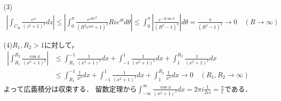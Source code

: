 \documentclass[
		book,
		head_space=20mm,
		foot_space=20mm,
		gutter=10mm,
		line_length=190mm
]{jlreq}
\begin{document}
 (3)\begin{align}
	\left|\int_{C_R} \frac{e^{iz}}{(z^2+1)^2}dz\right|\le \left| \int_0^\pi \frac{e^{iRe^{i\theta}}}{(R^2e^{2i\theta}+1)^2}Rie^{i\theta}d\theta\right| \le \int_0^\pi \left|\frac{e^{-R\sin \theta}}{(R^2-1)^2}\right|d\theta = \frac{\pi}{(R^2-1)^2}\rightarrow 0 \quad (R\rightarrow \infty)
 \end{align}

 (4)$R_1,R_2>1$に対して，
 \begin{align}
	\left|\int_{R_1}^{R_2} \frac{\cos x}{(x^2+1)^2}\right| &\le \int_{R_1}^{-1} \frac{1}{(x^2+1)^2}dx + \int_{-1}^{1} \frac{1}{(x^2+1)^2}dx + \int_{1}^{R_2} \frac{1}{(x^2+1)^2}dx \\
	&\le \int_{R_1}^{-1} \frac{1}{x^4}dx + \int_{-1}^{1} \frac{1}{(x^2+1)^2}dx + \int_{1}^{R_2} \frac{1}{x^4}dx\rightarrow 0 \quad (R_1,R_2\rightarrow \infty) 
 \end{align}
よって広義積分は収束する．
留数定理から$\int_{-\infty}^\infty \frac{\cos x}{(x^2+1)^2}dx=2\pi i\frac{1}{2ei}=\frac{\pi}{e}$である．

 

 

 
 
\end{document}
